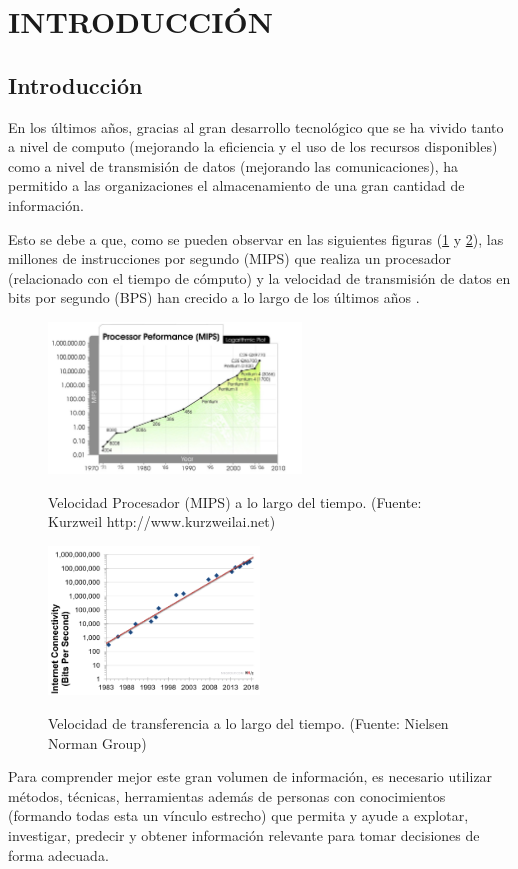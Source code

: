 
\section{INTRODUCCIÓN}
\subsection{Introducción}
En los últimos años, gracias al gran desarrollo tecnológico que se ha vivido tanto a nivel de computo (mejorando la eficiencia y el uso de los recursos disponibles) como a nivel de transmisión de datos (mejorando las comunicaciones), ha permitido a las organizaciones el almacenamiento de una gran cantidad de información.

Esto se debe a que, como se pueden observar en las siguientes figuras (\ref{fig:procPerformance} y \ref{fig:bandwidth-growth}), las millones de instrucciones por segundo (MIPS) que realiza un procesador (relacionado con el tiempo de cómputo) y la velocidad de transmisión de datos en bits por segundo (BPS) han crecido a lo largo de los últimos años \cite{Nielsen2018}.

\begin{figure}[htb]
	\centering
	\caption{Velocidad Procesador (MIPS) a lo largo del tiempo. (Fuente: Kurzweil http://www.kurzweilai.net)}
	\includegraphics[width=0.6\textwidth]{recursos/processor_performance}
	\label{fig:procPerformance}
\end{figure}
\FloatBarrier
\begin{figure}[htb]
	\centering
\caption{Velocidad de transferencia a lo largo del tiempo. (Fuente: Nielsen Norman Group)}
\includegraphics[width=0.5\textwidth]{recursos/bandwidth-growth-nielsen-law}
\label{fig:bandwidth-growth}
\end{figure}
\FloatBarrier
Para comprender mejor este gran volumen de información, es necesario utilizar métodos, técnicas, herramientas además de personas con conocimientos (formando todas esta un vínculo estrecho) que permita y ayude a explotar, investigar, predecir y obtener información relevante para tomar decisiones de forma adecuada.

